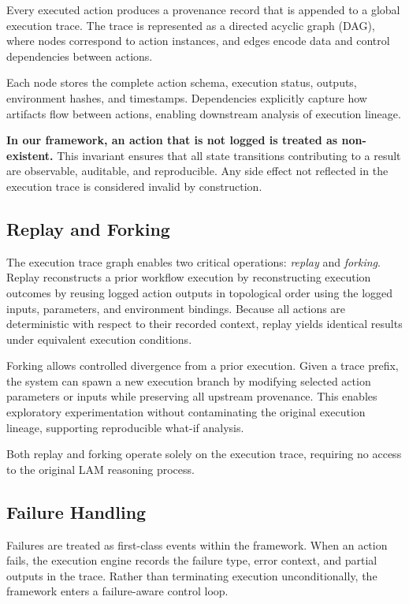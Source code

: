 \documentclass[conference]{IEEEtran}
\begin{document}
Every executed action produces a provenance record that is appended to a global execution trace. The trace is represented as a directed acyclic graph (DAG), where nodes correspond to action instances, and edges encode data and control dependencies between actions.

Each node stores the complete action schema, execution status, outputs, environment hashes, and timestamps. Dependencies explicitly capture how artifacts flow between actions, enabling downstream analysis of execution lineage.

\textbf{In our framework, an action that is not logged is treated as non-existent.}  
This invariant ensures that all state transitions contributing to a result are observable, auditable, and reproducible. Any side effect not reflected in the execution trace is considered invalid by construction.

\subsection{Replay and Forking}

The execution trace graph enables two critical operations: \emph{replay} and \emph{forking}. Replay reconstructs a prior workflow execution by reconstructing execution outcomes by reusing logged action outputs in topological order using the logged inputs, parameters, and environment bindings. Because all actions are deterministic with respect to their recorded context, replay yields identical results under equivalent execution conditions.

Forking allows controlled divergence from a prior execution. Given a trace prefix, the system can spawn a new execution branch by modifying selected action parameters or inputs while preserving all upstream provenance. This enables exploratory experimentation without contaminating the original execution lineage, supporting reproducible what-if analysis.

Both replay and forking operate solely on the execution trace, requiring no access to the original LAM reasoning process.

\subsection{Failure Handling}

Failures are treated as first-class events within the framework. When an action fails, the execution engine records the failure type, error context, and partial outputs in the trace. Rather than terminating execution unconditionally, the framework enters a failure-aware control loop.
\end{document}
